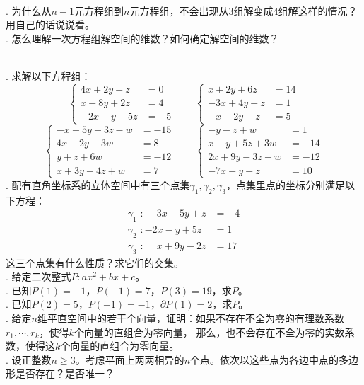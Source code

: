 \documentclass[12pt,UTF8]{ctexbook}
\begin{document}
\begin{sk}
    \mbox{} \\
    . 为什么从$n-1$元方程组到$n$元方程组，不会出现从$3$组解变成$4$组解这样的情况？用自己的话说说看。\\
    . 怎么理解一次方程组解空间的维数？如何确定解空间的维数？

\end{sk}

\begin{xt}
    \mbox{} \\
    . 求解以下方程组：
    $$ \left\{
        \begin{array}{rl}
    4x + 2y - z &= 0 \\
    x -  8y + 2z &= 4  \\
    -2x + y + 5z &= -5
    \end{array}
    \right. 
    \qquad\left\{
        \begin{array}{rl}
            x + 2y + 6z &= 14 \\
            -3x + 4y - z &= 1  \\
            -x -  2y + z &= 5 
    \end{array}
    \right. 
    $$  
    $$ \left\{
        \begin{array}{rl}
    -x - 5y + 3z  - w &= -15 \\
    4x - 2y + 3w &= 8 \\
    y + z  + 6w &= -12 \\
    x + 3y + 4z  + w &= 7
    \end{array}
    \right. 
    \qquad\left\{
        \begin{array}{rl}
            -y - z + w &= 1 \\
            x - y + 5z + 3w &= -14 \\
            2x + 9y - 3z  - w &= -12 \\
            -7x - y + z &= 10
    \end{array}
    \right. 
    $$  
    . 配有直角坐标系的立体空间中有三个点集$\gamma_1, \gamma_2, \gamma_3$，点集里点的坐标分别满足以下方程：
    \begin{align*}
        \gamma_1\,\,: \phantom{-}3x - 5y + z  &= -4 \\
        \gamma_2\,\,: -2x - y + 5z &= 1 \\
        \gamma_3\,\,: \phantom{-}x  + 9y - 2z &= 17
    \end{align*}
    这三个点集有什么性质？求它们的交集。\\
    . 给定二次整式$P: ax^2 + bx + c$。\\
    . 已知$P(1) = -1$，$P(-1) = 7$，$P(3) = 19$，求$P$。\\
    . 已知$P(2) = 5$，$P(-1) = -1$，$\partial P(1) = 2$，求$P$。\\
    . 给定$n$维平直空间中的若干个向量，证明：如果不存在不全为零的有理数系数$r_1, \cdots , r_k$，使得$k$个向量的直组合为零向量，
    那么，也不会存在不全为零的实数系数，使得这$k$个向量的直组合为零向量。\\
    . 设正整数$n\geqslant 3$。考虑平面上两两相异的$n$个点。依次以这些点为各边中点的多边形是否存在？是否唯一？
\end{xt}
\end{document}

